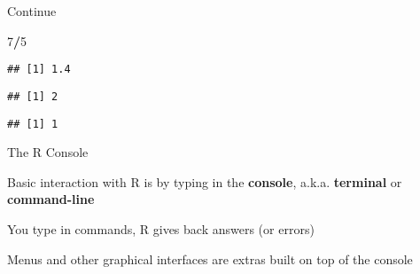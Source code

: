 \documentclass[8pt,ignorenonframetext,]{beamer}
\newenvironment{Shaded}{\begin{snugshade}}{\end{snugshade}}
\newcommand{\DecValTok}[1]{\textcolor[rgb]{0.00,0.00,0.81}{#1}}
\newcommand{\StringTok}[1]{\textcolor[rgb]{0.31,0.60,0.02}{#1}}
\newcommand{\OperatorTok}[1]{\textcolor[rgb]{0.81,0.36,0.00}{\textbf{#1}}}
\begin{document}
\begin{frame}[fragile]{Continue}

\begin{Shaded}
\begin{Highlighting}[]
\DecValTok{7}\OperatorTok{/}\DecValTok{5}
\end{Highlighting}
\end{Shaded}

\begin{verbatim}
## [1] 1.4
\end{verbatim}

\begin{Shaded}
\end{Shaded}

\begin{verbatim}
## [1] 2
\end{verbatim}

\begin{Shaded}
\end{Shaded}

\begin{verbatim}
## [1] 1
\end{verbatim}

\end{frame}

\begin{frame}{The R Console}

Basic interaction with R is by typing in the \textbf{console}, a.k.a.
\textbf{terminal} or \textbf{command-line}

You type in commands, R gives back answers (or errors)

Menus and other graphical interfaces are extras built on top of the
console

\end{frame}
\end{document}

